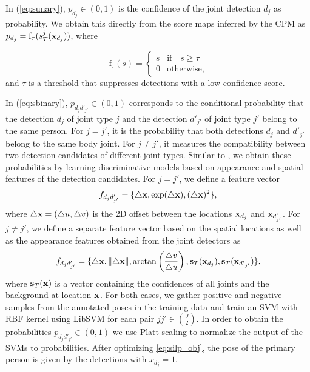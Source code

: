 \documentclass[runningheads]{llncs}
\begin{document}
In (\ref{eq:sunary}), $p_{d_j} \in (0,1)$ is the confidence of the joint detection $d_j$ as probability. We obtain this directly from the score maps inferred by the CPM as $p_{d_j} = \mathrm{f}_{\tau}(s^j_T(\bold{x}_{d_j}))$, where 
			
\begin{equation}
\mathrm{f}_{\tau}(s) = \begin{cases}
         s & \text{if} \quad s \geq \tau \\
         0 & \text{otherwise,}
        \end{cases}
\label{eq:unary_thresh}
\end{equation}
and $\tau$ is a threshold that suppresses detections with a low confidence score. 

In (\ref{eq:sbinary}), $p_{{d_j}{d'_{j'}}} \in (0,1)$ corresponds to the conditional probability that the detection $d_j$ of joint type $j$ and the detection $d'_{j'}$ of joint type $j'$ belong to the same person. For $ j = j' $, it is the probability that both detections $d_j$ and $d'_{j'}$ belong to the same body joint. For $j \neq j'$, it measures the compatibility between two detection candidates of different joint types. Similar to \cite{pishchulin2015deepcut}, we obtain these probabilities by learning discriminative models based on appearance and spatial features of the detection candidates. For $j = j'$, we define a feature vector 
\begin{equation}
f_{{d_j}{d'_{j'}}} = \{\bigtriangleup \bold{x}, \exp (\bigtriangleup \bold{x}), (\bigtriangleup \bold{x})^2\},
\end{equation}  
where $\bigtriangleup \bold{x} = (\bigtriangleup u, \bigtriangleup v)$ is the 2D offset between the locations $\bold{x}_{d_j}$ and $\bold{x}_{d'_{j'}}$.
For $j \neq j'$, we define a separate feature vector based on the spatial locations as well as the appearance features obtained from the joint detectors as 
\begin{equation}
f_{{d_j}{d'_{j'}}} = \{\bigtriangleup \bold{x}, \lVert\bigtriangleup \bold{x}\rVert, \arctan\left(\dfrac{\bigtriangleup v }{\bigtriangleup u}\right), \bold{s}_{T}(\bold{x}_{d_j}), \bold{s}_{T}(\bold{x}_{{d'}_{j'}}) \},
\end{equation} 
where $\bold{s}_{T}(\bold{x})$ is a vector containing the confidences of all joints and the background at location $\bold{x}$.  
For both cases, we gather positive and negative samples from the annotated poses in the training data and train an SVM with RBF kernel using LibSVM \cite{libsvm} for each pair $jj' \in \binom J2$. In order to obtain the probabilities $p_{{d_j}{d'_{j'}}} \in (0,1)$ we use Platt scaling \cite{Platt99probabilisticoutputs} to normalize the output of the SVMs to probabilities. After optimizing \eqref{eq:silp_obj}, the pose of the primary person is given by the detections with $x_{d_j}=1$. 
\end{document}
